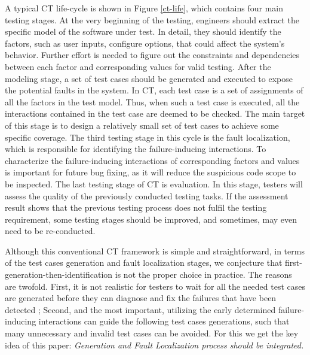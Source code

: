 \documentclass{sig-alternate}
\begin{document}
A typical CT life-cycle is shown in Figure \ref{ct-life}, which contains four main testing stages. At the very beginning of the testing, engineers should extract the specific model of the software under test. In detail, they should identify the factors, such as user inputs, configure options, that could affect the system's behavior. Further effort is needed to figure out the constraints and dependencies between each factor and corresponding values for valid testing. After the modeling stage, a set of test cases should be generated and executed to expose the potential faults in the system. In CT, each test case is a set of assignments of all the factors in the test model. Thus, when such a test case is executed, all the interactions contained in the test case are deemed to be checked. The main target of this stage is to design a relatively small set of test cases to achieve some specific coverage. The third testing stage in this cycle is the fault localization, which is responsible for identifying the failure-inducing interactions. To characterize the failure-inducing interactions of corresponding factors and values is important for future bug fixing, as it will reduce the suspicious code scope to be inspected. The last testing stage of CT is evaluation. In this stage, testers will assess the quality of the previously conducted testing tasks. If the assessment result shows that the previous testing process does not fulfil the testing requirement, some testing stages should be improved, and sometimes, may even need to be re-conducted.


Although this conventional CT framework is simple and straightforward, in terms of the test cases generation and fault localization stages, we conjecture that first-generation-then-identification is not the proper choice in practice. The reasons are twofold. First, it is not realistic for testers to wait for all the needed test cases are generated before they can diagnose and fix the failures that have been detected \cite{yoo2013fault}; Second, and the most important, utilizing the early determined failure-inducing interactions can guide the following test cases generations, such that many unnecessary and invalid test cases can be avoided. For this we get the key idea of this paper: \emph{Generation and Fault Localization process should be integrated.}
\end{document}
